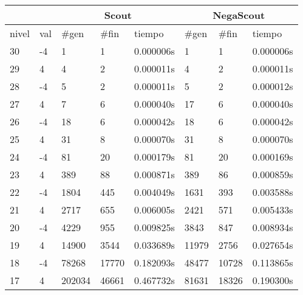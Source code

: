 \documentclass{article}
\begin{document}
\begin{table}[ht]
\begin{tabular}{|l|l|l|l|l|l|l|l|}
\hline
      &                & \multicolumn{3}{c|}{Scout}                       & \multicolumn{3}{c|}{NegaScout}                   \\ \hline
nivel & val & \#gen & \#fin & tiempo         & \#gen & \#fin & tiempo         \\ \hline
30    & -4             & 1               & 1             & 0.000006s& 1               & 1             & 0.000006s\\ \hline
29    & 4              & 4               & 2             & 0.000011s& 4               & 2             & 0.000011s\\ \hline
28    & -4             & 5               & 2             & 0.000011s& 5               & 2             & 0.000012s\\ \hline
27    & 4              & 7               & 6             & 0.000040s& 17              & 6             & 0.000040s\\ \hline
26    & -4             & 18              & 6             & 0.000042s& 18              & 6             & 0.000042s\\ \hline
25    & 4              & 31              & 8             & 0.000070s& 31              & 8             & 0.000070s\\ \hline
24    & -4             & 81              & 20            & 0.000179s& 81              & 20            & 0.000169s\\ \hline
23    & 4              & 389             & 88            & 0.000871s& 389             & 86            & 0.000859s\\ \hline
22    & -4             & 1804            & 445           & 0.004049s& 1631            & 393           & 0.003588s\\ \hline
21    & 4              & 2717            & 655           & 0.006005s& 2421            & 571           & 0.005433s\\ \hline
20    & -4             & 4229            & 955           & 0.009825s& 3843            & 847           & 0.008934s\\ \hline
19    & 4              & 14900           & 3544          & 0.033689s& 11979           & 2756          & 0.027654s\\ \hline
18    & -4             & 78268           & 17770         & 0.182093s& 48477           & 10728         & 0.113865s\\ \hline
17    & 4              & 202034          & 46661         & 0.467732s& 81631           & 18326         & 0.190300s\\ \hline

\end{tabular}
\end{table}
\end{document}
